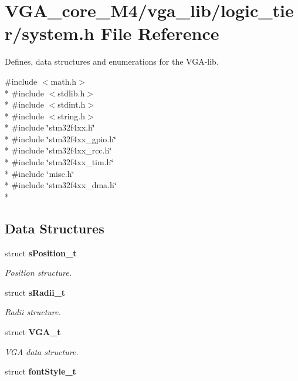 \section{V\+G\+A\+\_\+core\+\_\+\+M4/vga\+\_\+lib/logic\+\_\+tier/system.h File Reference}
\label{system_8h}


Defines, data structures and enumerations for the V\+G\+A-\/lib.  


{\ttfamily \#include $<$math.\+h$>$}\\*
{\ttfamily \#include $<$stdlib.\+h$>$}\\*
{\ttfamily \#include $<$stdint.\+h$>$}\\*
{\ttfamily \#include $<$string.\+h$>$}\\*
{\ttfamily \#include \char`\"{}stm32f4xx.\+h\char`\"{}}\\*
{\ttfamily \#include \char`\"{}stm32f4xx\+\_\+gpio.\+h\char`\"{}}\\*
{\ttfamily \#include \char`\"{}stm32f4xx\+\_\+rcc.\+h\char`\"{}}\\*
{\ttfamily \#include \char`\"{}stm32f4xx\+\_\+tim.\+h\char`\"{}}\\*
{\ttfamily \#include \char`\"{}misc.\+h\char`\"{}}\\*
{\ttfamily \#include \char`\"{}stm32f4xx\+\_\+dma.\+h\char`\"{}}\\*
\subsection*{Data Structures}
\begin{DoxyCompactItemize}
\item 
struct {\bf s\+Position\+\_\+t}
\begin{DoxyCompactList}\small\item\em Position structure. \end{DoxyCompactList}\item 
struct {\bf s\+Radii\+\_\+t}
\begin{DoxyCompactList}\small\item\em Radii structure. \end{DoxyCompactList}\item 
struct {\bf V\+G\+A\+\_\+t}
\begin{DoxyCompactList}\small\item\em V\+GA data structure. \end{DoxyCompactList}\item 
struct {\bf font\+Style\+\_\+t}
\end{DoxyCompactItemize}
